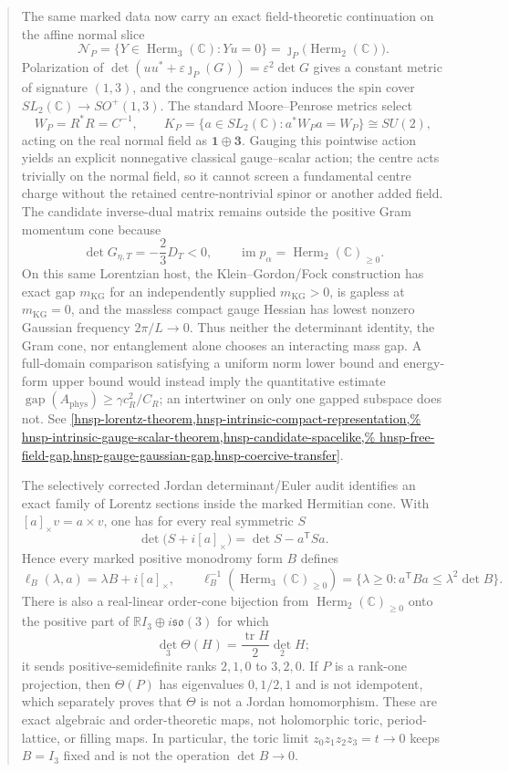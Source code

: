 \documentclass[11pt,letterpaper]{article}
\theoremstyle{definition}
\theoremstyle{remark}
\begin{document}
\begin{abstract}
 The same marked data now carry an exact field-theoretic continuation on the
 affine normal slice
 \[
  \mathcal N_P=\{Y\in\operatorname{Herm}_3(\mathbb C):Yu=0\}
  =\jmath_P\bigl(\operatorname{Herm}_2(\mathbb C)\bigr).
 \]
 Polarization of
 \(\det(uu^*+\varepsilon\jmath_P(G))=\varepsilon^2\det G\)
 gives a constant metric of signature \((1,3)\), and the congruence action
 induces the spin cover
 \(SL_2(\mathbb C)\to SO^+(1,3)\).  The standard Moore--Penrose metrics select
 \[
  W_P=R^*R=C^{-1},\qquad
  K_P=\{a\in SL_2(\mathbb C):a^*W_Pa=W_P\}\cong SU(2),
 \]
 acting on the real normal field as \(\boldsymbol1\oplus\boldsymbol3\).
 Gauging this pointwise action yields an explicit nonnegative classical
 gauge--scalar action; the centre acts trivially on the normal field, so it
 cannot screen a fundamental centre charge without the retained
 centre-nontrivial spinor or another added field.  The candidate inverse-dual
 matrix remains outside the positive Gram momentum cone because
 \[
  \det G_{\eta,T}=-\frac23D_T<0,
  \qquad \operatorname{im}p_\alpha=
  \operatorname{Herm}_2(\mathbb C)_{\geq0}.
 \]
 On this same Lorentzian host, the Klein--Gordon/Fock construction has exact
 gap \(m_{\mathrm{KG}}\) for an independently supplied
 \(m_{\mathrm{KG}}>0\), is gapless at \(m_{\mathrm{KG}}=0\), and the massless
 compact gauge Hessian has lowest nonzero Gaussian frequency \(2\pi/L\to0\).
 Thus neither the determinant identity, the Gram cone, nor entanglement alone
 chooses an interacting mass gap.  A full-domain comparison satisfying a
 uniform norm lower bound and energy-form upper bound would instead imply the
 quantitative estimate \(\operatorname{gap}(A_{\mathrm{phys}})\geq
 \gamma c_R^2/C_R\); an intertwiner on only one gapped subspace does not.
 See \cref{hnsp-lorentz-theorem,hnsp-intrinsic-compact-representation,%
 hnsp-intrinsic-gauge-scalar-theorem,hnsp-candidate-spacelike,%
 hnsp-free-field-gap,hnsp-gauge-gaussian-gap,hnsp-coercive-transfer}.

 The selectively corrected Jordan determinant/Euler audit identifies an exact family of
 Lorentz sections inside the marked Hermitian cone.  With
 \([a]_{\times}v=a\times v\), one has for every real symmetric \(S\)
 \[
  \det\bigl(S+i[a]_{\times}\bigr)=\det S-a^{\mathsf T}Sa.
 \]
 Hence every marked positive monodromy form \(B\) defines
 \[
  \ell_B(\lambda,a)=\lambda B+i[a]_{\times},\qquad
  \ell_B^{-1}\!\left(\operatorname{Herm}_3(\mathbb C)_{\geq0}\right)
  =\{\lambda\geq0:a^{\mathsf T}Ba\leq\lambda^2\det B\}.
 \]
 There is also a real-linear order-cone bijection from
 \(\operatorname{Herm}_2(\mathbb C)_{\geq0}\) onto the positive part of
 \(\mathbb RI_3\oplus i\mathfrak{so}(3)\) for which
 \[
  \det_3\Theta(H)=\frac{\operatorname{tr}H}{2}\det_2H;
 \]
 it sends positive-semidefinite ranks \(2,1,0\) to \(3,2,0\).  If \(P\) is a
 rank-one projection, then \(\Theta(P)\) has eigenvalues \(0,1/2,1\) and is
 not idempotent, which separately proves that \(\Theta\) is not a Jordan
 homomorphism.  These are exact algebraic and order-theoretic maps, not holomorphic
 toric, period-lattice, or filling maps.  In particular, the toric limit
 \(z_0z_1z_2z_3=t\to0\) keeps \(B=I_3\) fixed and is not the operation
 \(\det B\to0\).


\end{abstract}
\end{document}
